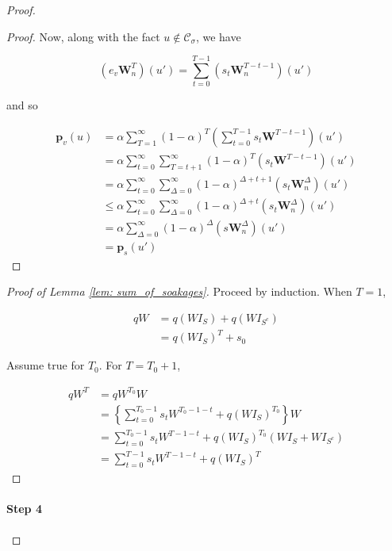 \documentclass{article}
\newcommand{\1}{\mathbf{1}}
\newcommand{\pbf}{\mathbf{p}}
\newcommand{\Wbf}{\mathbf{W}}
\newcommand{\Cset}{\mathcal{C}}
\newcommand{\Csig}{\Cset_{\sigma}}
\theoremstyle{aldenthm}
\begin{document}
\begin{proof}
\begin{proof}
		Now, along with the fact $u \not\in \Csig$, we have
		
		\begin{equation*}
		\left(e_v \Wbf_n^T \right)(u') = \sum_{t = 0}^{T - 1} \left(s_t \Wbf_n^{T - t - 1} \right)(u')
		\end{equation*}
		
		and so
		
		\begin{align*}
		\pbf_v(u) & = \alpha \sum_{T=1}^{\infty} (1 - \alpha)^T \left( \sum_{t = 0}^{T - 1} s_t \Wbf^{T - t - 1} \right)(u') \\
		& = \alpha \sum_{t=0}^{\infty} \sum_{T = t + 1}^{\infty} (1 - \alpha)^T \left( s_t \Wbf^{T - t - 1} \right)(u')\\
		& = \alpha \sum_{t=0}^{\infty} \sum_{\Delta = 0}^{\infty} (1 - \alpha)^{\Delta + t + 1} \left( s_t \Wbf_n^{\Delta} \right)(u') \\
		& \leq \alpha \sum_{t=0}^{\infty} \sum_{\Delta = 0}^{\infty} (1 - \alpha)^{\Delta + t } \left( s_t \Wbf_n^{\Delta} \right)(u') \\
		& = \alpha \sum_{\Delta = 0}^{\infty} (1 - \alpha)^{\Delta} \left(s \Wbf_n^{\Delta}\right)(u') \\
		& = \pbf_s(u')
		\end{align*}
	\end{proof}
	
	\begin{proof}[Proof of Lemma \ref{lem: sum_of_soakages}]
		Proceed by induction. When $T = 1$,
		
		\begin{align*}
		qW & = q(WI_S) + q(WI_{S^c}) \\
		& = q(W I_S)^T + s_0 
		\end{align*}
		
		Assume true for $T_0$. For $T = T_0 + 1$,
		
		\begin{align*}
		qW^T & = qW^{T_0}W \\
		& = \left\{ \sum_{t = 0}^{T_0 - 1} s_t W^{T_0 - 1 - t} + q(WI_S)^{T_0} \right\} W \\
		& =  \sum_{t = 0}^{T_0 - 1} s_t W^{T - 1 - t} + q(WI_S)^{T_0}(WI_S + WI_{S^c}) \\
		& =  \sum_{t = 0}^{T - 1} s_t W^{T - 1 - t} + q(WI_S)^{T}
		\end{align*}
	\end{proof}
	
	\paragraph{Step 4}
	

\end{proof}
\end{document}
